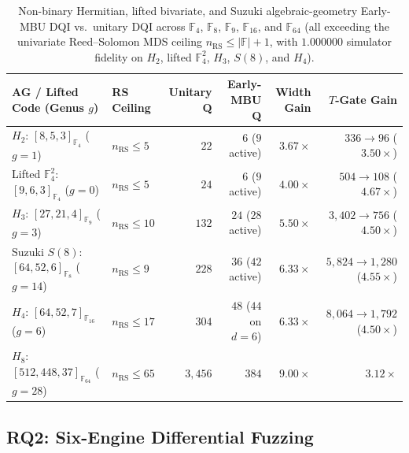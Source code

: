\documentclass[acmsmall,screen,anonymous]{acmart}
\DeclareRobustCommand{\_}{\ifmmode\text{\char95}\else\char95\penalty0\relax\fi}
\theoremstyle{plain}
\begin{document}
\begin{table}[t]
\centering
\caption{Non-binary Hermitian, lifted bivariate, and Suzuki algebraic-geometry Early-MBU DQI vs.\ unitary DQI across $\mathbb{F}_4$, $\mathbb{F}_8$, $\mathbb{F}_9$, $\mathbb{F}_{16}$, and $\mathbb{F}_{64}$ (all exceeding the univariate Reed--Solomon MDS ceiling $n_{\mathrm{RS}} \le |\mathbb{F}| + 1$, with $1.000000$ simulator fidelity on $H_2$, lifted $\mathbb{F}_4^2$, $H_3$, $S(8)$, and $H_4$).}
\label{tab:ag_dqi}
\footnotesize
\setlength{\tabcolsep}{4pt}
\begin{tabular}{llrrrr}
\toprule
AG / Lifted Code (Genus $g$) & RS Ceiling & Unitary Q & Early-MBU Q & Width Gain & $T$-Gate Gain \\
\midrule
$H_2$: $[8, 5, 3]_{\mathbb{F}_4}$ ($g=1$) & $n_{\mathrm{RS}} \le 5$ & $22$ & $6$ ($9$ active) & $3.67\times$ & $336 \to 96$ ($3.50\times$) \\
Lifted $\mathbb{F}_4^2$: $[9, 6, 3]_{\mathbb{F}_4}$ ($g=0$) & $n_{\mathrm{RS}} \le 5$ & $24$ & $6$ ($9$ active) & $4.00\times$ & $504 \to 108$ ($4.67\times$) \\
$H_3$: $[27, 21, 4]_{\mathbb{F}_9}$ ($g=3$) & $n_{\mathrm{RS}} \le 10$ & $132$ & $24$ ($28$ active) & $5.50\times$ & $3{,}402 \to 756$ ($4.50\times$) \\
Suzuki $S(8)$: $[64, 52, 6]_{\mathbb{F}_8}$ ($g=14$) & $n_{\mathrm{RS}} \le 9$ & $228$ & $36$ ($42$ active) & $6.33\times$ & $5{,}824 \to 1{,}280$ ($4.55\times$) \\
$H_4$: $[64, 52, 7]_{\mathbb{F}_{16}}$ ($g=6$) & $n_{\mathrm{RS}} \le 17$ & $304$ & $48$ ($44$ on $d{=}6$) & $6.33\times$ & $8{,}064 \to 1{,}792$ ($4.50\times$) \\
$H_8$: $[512, 448, 37]_{\mathbb{F}_{64}}$ ($g=28$) & $n_{\mathrm{RS}} \le 65$ & $3{,}456$ & $384$ & $9.00\times$ & $3.12\times$ \\
\bottomrule
\end{tabular}
\end{table}

\subsection{RQ2: Six-Engine Differential Fuzzing}
\label{sec:fuzzing}
\end{document}
